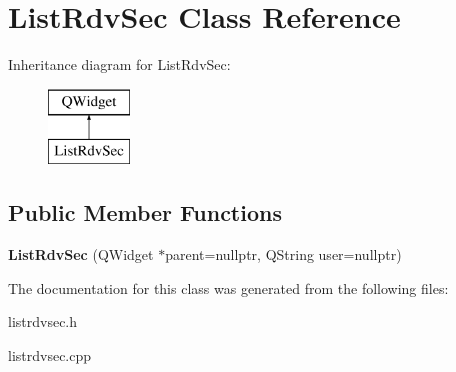 \hypertarget{class_list_rdv_sec}{}\section{List\+Rdv\+Sec Class Reference}
\label{class_list_rdv_sec}
Inheritance diagram for List\+Rdv\+Sec\+:\begin{figure}[H]
\begin{center}
\leavevmode
\includegraphics[height=2.000000cm]{class_list_rdv_sec}
\end{center}
\end{figure}
\subsection*{Public Member Functions}
\begin{DoxyCompactItemize}
\item 
\mbox{\label{class_list_rdv_sec_a76dafffd7b1fd45d6e60389365960434}} 
{\bfseries List\+Rdv\+Sec} (Q\+Widget $\ast$parent=nullptr, Q\+String user=nullptr)
\end{DoxyCompactItemize}


The documentation for this class was generated from the following files\+:\begin{DoxyCompactItemize}
\item 
listrdvsec.\+h\item 
listrdvsec.\+cpp\end{DoxyCompactItemize}
